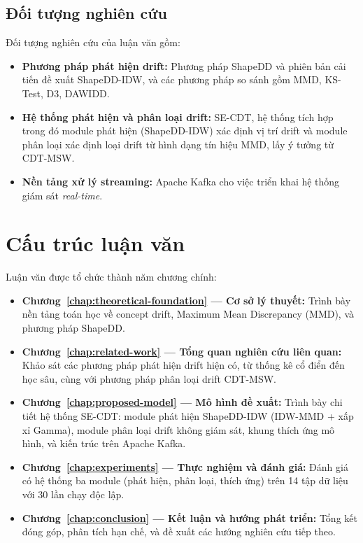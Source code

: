 \subsection{Đối tượng nghiên cứu}
Đối tượng nghiên cứu của luận văn gồm:
\begin{itemize}
	\item \textbf{Phương pháp phát hiện drift:} Phương pháp ShapeDD và phiên bản cải tiến đề xuất ShapeDD-IDW, và các phương pháp so sánh gồm MMD, KS-Test, D3, DAWIDD.
	\item \textbf{Hệ thống phát hiện và phân loại drift:} SE-CDT, hệ thống tích hợp trong đó module phát hiện (ShapeDD-IDW) xác định vị trí drift và module phân loại xác định loại drift từ hình dạng tín hiệu MMD, lấy ý tưởng từ CDT-MSW.
	\item \textbf{Nền tảng xử lý streaming:} Apache Kafka cho việc triển khai hệ thống giám sát \textit{real-time}.
\end{itemize}

\section{Cấu trúc luận văn}
Luận văn được tổ chức thành năm chương chính:
\begin{itemize}
	\item \textbf{Chương~\ref{chap:theoretical-foundation} --- Cơ sở lý thuyết:} Trình bày nền tảng toán học về concept drift, Maximum Mean Discrepancy (MMD), và phương pháp ShapeDD.
	\item \textbf{Chương~\ref{chap:related-work} --- Tổng quan nghiên cứu liên quan:} Khảo sát các phương pháp phát hiện drift hiện có, từ thống kê cổ điển đến học sâu, cùng với phương pháp phân loại drift CDT-MSW.
	\item \textbf{Chương~\ref{chap:proposed-model} --- Mô hình đề xuất:} Trình bày chi tiết hệ thống SE-CDT: module phát hiện ShapeDD-IDW (IDW-MMD + xấp xỉ Gamma), module phân loại drift không giám sát, khung thích ứng mô hình, và kiến trúc trên Apache Kafka.
	\item \textbf{Chương~\ref{chap:experiments} --- Thực nghiệm và đánh giá:} Đánh giá có hệ thống ba module (phát hiện, phân loại, thích ứng) trên 14 tập dữ liệu với 30 lần chạy độc lập.
	\item \textbf{Chương~\ref{chap:conclusion} --- Kết luận và hướng phát triển:} Tổng kết đóng góp, phân tích hạn chế, và đề xuất các hướng nghiên cứu tiếp theo.
\end{itemize}
